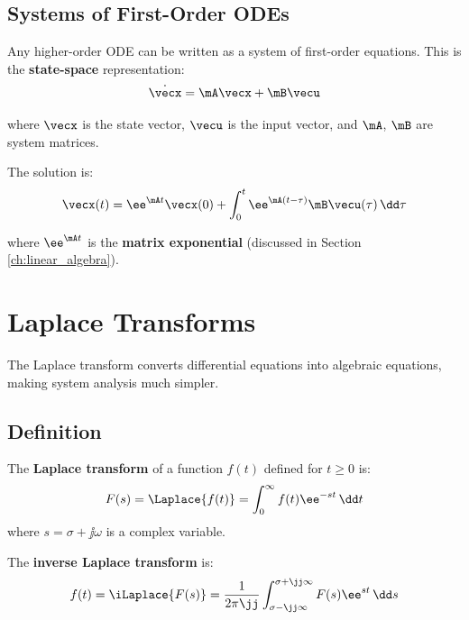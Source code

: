 \section{Systems of First-Order ODEs}

Any higher-order ODE can be written as a system of first-order equations. This is the \textbf{state-space} representation:
\begin{equation}
\dot{\vecx} = \mA\vecx + \mB\vecu
\end{equation}

where $\vecx$ is the state vector, $\vecu$ is the input vector, and $\mA$, $\mB$ are system matrices.

The solution is:
\begin{equation}
\vecx(t) = \ee^{\mA t}\vecx(0) + \int_0^t \ee^{\mA(t-\tau)}\mB\vecu(\tau) \, \dd\tau
\end{equation}

where $\ee^{\mA t}$ is the \textbf{matrix exponential} (discussed in Section \ref{ch:linear_algebra}).

\chapter{Laplace Transforms}
\label{ch:laplace}

The Laplace transform converts differential equations into algebraic equations, making system analysis much simpler.

\section{Definition}

\begin{definitionbox}[title=Definition 0.2: Laplace Transform]
The \textbf{Laplace transform} of a function $f(t)$ defined for $t \geq 0$ is:
\begin{equation}
F(s) = \Laplace\{f(t)\} = \int_0^\infty f(t)\ee^{-st} \, \dd t
\end{equation}
where $s = \sigma + \jj\omega$ is a complex variable.
\end{definitionbox}

The \textbf{inverse Laplace transform} is:
\begin{equation}
f(t) = \iLaplace\{F(s)\} = \frac{1}{2\pi\jj} \int_{\sigma-\jj\infty}^{\sigma+\jj\infty} F(s)\ee^{st} \, \dd s
\end{equation}

